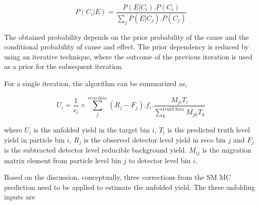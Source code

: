 \begin{equation}
P(C_{i}|E) = \frac{ P(E|C_{i}) . P(C_{i}) } { \sum_{j}{ P(E|C_{j}).P(C_{j}) } }
\label{eqn:BayesTheorem}
\end{equation}

The obtained probability depends on the prior probability of the cause and the conditional probability of cause and effect. The prior dependency is reduced by using an iterative technique, where the outcome of the previous iteration is used as a prior for the subsequent iteration.

For a single iteration, the algorithm can be summarized as, 

\begin{equation}
    U_{i} = \frac{1}{ \epsilon_{i} } \times \sum^{reco~bins}_{j}{ (R_j -F_j ) . f_{i} . \frac{M_{ji} T_{i}}{ \sum_{k}^{truth~bins}{M_{jk} T_{k}}} } 
    \label{eqn:BayesianUnfolding}
\end{equation}

where $U_{i}$ is the unfolded yield in the target bin $i$, $T_{i}$ is the predicted truth level yield in particle bin $i$, $R_{j}$ is the observed detector level yield in reco bin $j$ and $F_{j}$ is the subtracted detector level reducible background yield. $M_{ij}$ is the migration matrix element from particle level bin $j$ to detector level bin $i$. 

Based on the discussion, conceptually, three corrections from the SM MC prediction need to be applied to estimate the unfolded yield. The three unfolding inputs are 

